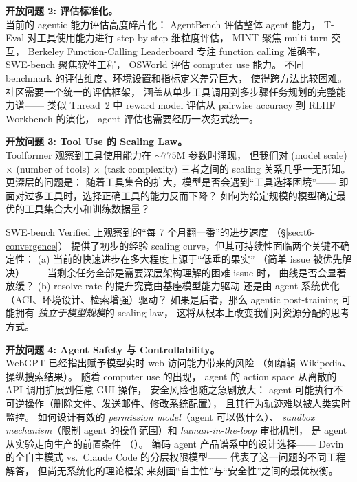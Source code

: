 \begin{openproblembox}
\textbf{开放问题 2: 评估标准化。}\\
当前的 agentic 能力评估高度碎片化：
AgentBench \citep{liu2023agentbench} 评估整体 agent 能力，
T-Eval \citep{chen2023teval} 对工具使用能力进行 step-by-step 细粒度评估，
MINT \citep{wang2023mint} 聚焦 multi-turn 交互，
Berkeley Function-Calling Leaderboard \citep{patil2024bfcl} 专注 function calling 准确率，
SWE-bench \citep{jimenez2024swebench} 聚焦软件工程，
OSWorld \citep{xie2024osworld} 评估 computer use 能力。
不同 benchmark 的评估维度、环境设置和指标定义差异巨大，
使得跨方法比较困难。
社区需要一个统一的评估框架，
涵盖从单步工具调用到多步骤任务规划的完整能力谱——
类似 Thread~2 中 reward model 评估从 pairwise accuracy 到 RLHF Workbench 的演化，
agent 评估也需要经历一次范式统一。
\end{openproblembox}

\begin{openproblembox}
\textbf{开放问题 3: Tool Use 的 Scaling Law。}\\
Toolformer 观察到工具使用能力在 ${\sim}775$M 参数时涌现，
但我们对 (model scale) $\times$ (number of tools) $\times$ (task complexity)
三者之间的 scaling 关系几乎一无所知。
更深层的问题是：
随着工具集合的扩大，模型是否会遇到``工具选择困境''——
即面对过多工具时，选择正确工具的能力反而下降？
如何为给定规模的模型确定最优的工具集合大小和训练数据量？

SWE-bench Verified 上观察到的``每 7 个月翻一番''的进步速度
（\S\ref{sec:t6-convergence}）
提供了初步的经验 scaling curve，但其可持续性面临两个关键不确定性：
(a) 当前的快速进步在多大程度上源于``低垂的果实''
（简单 issue 被优先解决）——
当剩余任务全部是需要深层架构理解的困难 issue 时，
曲线是否会显著放缓？
(b) resolve rate 的提升究竟由基座模型能力驱动
还是由 agent 系统优化（ACI、环境设计、检索增强）驱动？
如果是后者，那么 agentic post-training 可能拥有
\emph{独立于模型规模}的 scaling law，
这将从根本上改变我们对资源分配的思考方式。
\end{openproblembox}

\begin{openproblembox}
\textbf{开放问题 4: Agent Safety 与 Controllability。}\\
WebGPT 已经指出赋予模型实时 web 访问能力带来的风险
（如编辑 Wikipedia、操纵搜索结果）。
随着 computer use 的出现，
agent 的 action space 从离散的 API 调用扩展到任意 GUI 操作，
安全风险也随之急剧放大：
agent 可能执行不可逆操作（删除文件、发送邮件、修改系统配置），
且其行为轨迹难以被人类实时监控。
如何设计有效的 \emph{permission model}（agent 可以做什么）、
\emph{sandbox mechanism}（限制 agent 的操作范围）和
\emph{human-in-the-loop} 审批机制，
是 agent 从实验走向生产的前置条件
（）。
编码 agent 产品谱系中的设计选择——
Devin 的全自主模式 vs.\ Claude Code 的分层权限模型——
代表了这一问题的不同工程解答，
但尚无系统化的理论框架
来刻画``自主性''与``安全性''之间的最优权衡。
\end{openproblembox}



